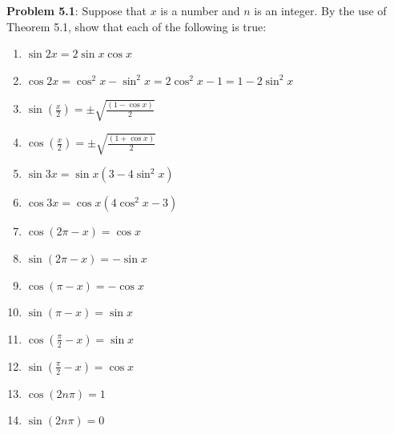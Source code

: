\documentclass[english]{book}
\begin{document}
\textbf{Problem 5.1}: Suppose that $x$ is a number and $n$ is an integer. By the use of Theorem 5.1, show that each of the following is true:
\begin{enumerate}[\hspace{1cm}1)]
  \item $\sin 2x = 2\sin x\cos x$
  \item $\cos 2x = \cos^{2}x - \sin^{2}x = 2\cos^{2}x - 1 = 1 - 2\sin^{2}x$
  \item $\sin (\frac{x}{2}) = \pm \sqrt{\frac{(1-\cos x)}{2}}$
  \item $\cos (\frac{x}{2}) = \pm \sqrt{\frac{(1+\cos x)}{2}}$
  \item $\sin 3x = \sin x(3-4\sin^{2}x)$
  \item $\cos 3x = \cos x(4\cos^{2}x-3)$
  \item $\cos (2\pi-x) = \cos x$
  \item $\sin (2\pi-x) = -\sin x$
  \item $\cos (\pi-x) = -\cos x$
  \item $\sin (\pi-x) = \sin x$
  \item $\cos (\frac{\pi}{2}-x) = \sin x$
  \item $\sin (\frac{\pi}{2}-x) = \cos x$
  \item $\cos (2n\pi) = 1$
  \item $\sin (2n\pi) = 0$
\end{enumerate}
\end{document}
